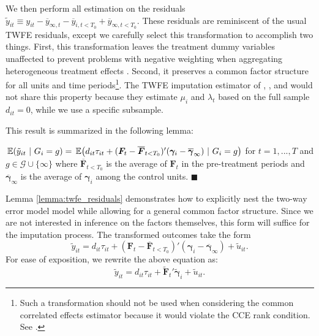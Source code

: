 \documentclass[12pt]{article}
\begin{document}
We then perform all estimation on the residuals $\tilde{y}_{it} \equiv y_{it} - \overline{y}_{\infty, t} - \overline{y}_{i,t < T_0} + \overline{y}_{\infty, t < T_0}$. These residuals are reminiscent of the usual TWFE residuals, except we carefully select this transformation to accomplish two things. First, this transformation leaves the treatment dummy variables unaffected to prevent problems with negative weighting when aggregating heterogeneous treatment effects \citep{Goodman-Bacon_2021,Borusyak_Jaravel_Spiess_2021}. Second, it preserves a common factor structure for all units and time periods\footnote{Such a transformation should not be used when considering the common correlated effects estimator because it would violate the CCE rank condition. See \citet{Brown_Butts_Westerlund_2023}.}. The TWFE imputation estimator of \citet{Gardner_2021}, \citet{Wooldridge_2021}, and \citet{Borusyak_Jaravel_Spiess_2021} would not share this property because they estimate $\mu_i$ and $\lambda_t$ based on the full sample $d_{it} = 0$, while we use a specific subsample.

This result is summarized in the following lemma:
\begin{lemma}\label{lemma:twfe_residuals}
  $\expec{\tilde{y}_{it}}{G_i = g} = \expec{d_{it}\tau_{it} + (\bm{F}_t - \overline{\bm{F}}_{t < T_0})' (\bm \gamma_i - \overline{\bm \gamma}_{\infty}) }{G_i = g}$ for $t = 1,...,T$ and $g \in \mathcal{G} \cup \{ \infty \}$ where $\overline{\bm{F}}_{t < T_0}$ is the average of $\bm{F}_t$ in the pre-treatment periods and $\overline{\bm\gamma}_\infty$ is the average of $\bm \gamma_i$ among the control units. $\blacksquare$
\end{lemma}

Lemma \ref{lemma:twfe_residuals} demonstrates how to explicitly nest the two-way error model model while allowing for a general common factor structure. Since we are not interested in inference on the factors themselves, this form will suffice for the imputation process. The transformed outcomes take the form
\begin{equation}
  \tilde{y}_{it} = d_{it} \tau_{it} + (\bm{F}_t - \overline{\bm{F}}_{t < T_0})' (\bm \gamma_i - \overline{\bm \gamma}_\infty) + \tilde{u}_{it}.
\end{equation}
For ease of exposition, we rewrite the above equation as:
\begin{equation}
  \tilde{y}_{it} = d_{it} \tau_{it} + \tilde{\bm{F}}_t' \tilde{\bm \gamma}_i + \tilde{u}_{it}.
\end{equation}
\end{document}
